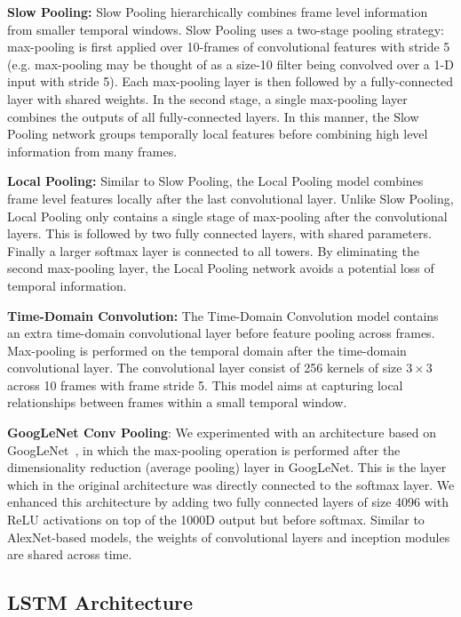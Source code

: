 \documentclass[10pt,twocolumn,letterpaper]{article}
\begin{document}
{\bf Slow Pooling:} Slow Pooling hierarchically combines frame level information from smaller temporal windows. Slow Pooling uses a two-stage pooling strategy: max-pooling is first applied over 10-frames of convolutional features with stride 5 (e.g. max-pooling may be thought of as a size-10 filter being convolved over a 1-D input with stride 5). Each max-pooling layer is then followed by a fully-connected layer with shared weights. In the second stage, a single max-pooling layer combines the outputs of all fully-connected layers. In this manner, the Slow Pooling network groups temporally local features before combining high level information from many frames.

{\bf Local Pooling:} Similar to Slow Pooling, the Local Pooling model combines frame level features locally after the last convolutional layer. Unlike Slow Pooling, Local Pooling only contains a single stage of max-pooling after the convolutional layers. This is followed by two fully connected layers, with shared parameters. Finally a larger softmax layer is connected to all towers. By eliminating the second max-pooling layer, the Local Pooling network avoids a potential loss of temporal information.

{\bf Time-Domain Convolution:} The Time-Domain Convolution model contains an extra time-domain convolutional layer before feature pooling across frames. Max-pooling is performed on the temporal domain after the time-domain convolutional layer. The convolutional layer consist of 256 kernels of size $3 \times 3$ across 10 frames with frame stride 5. This model aims at capturing local relationships between frames within a small temporal window.

{\bf GoogLeNet Conv Pooling}: We experimented with an architecture based on GoogLeNet~\cite{szegedy14going}, in which the max-pooling operation
is performed after the dimensionality reduction (average pooling) layer in GoogLeNet. This is the layer which in the original architecture was
directly connected to the softmax layer. We enhanced this architecture by adding two fully connected
layers of size 4096 with ReLU activations on top of the 1000D output but before softmax. Similar to AlexNet-based models, the weights of convolutional layers
 and inception modules are shared across time.

\vspace{-.6em}\subsection{LSTM Architecture}\vspace{-.6em}
\end{document}
